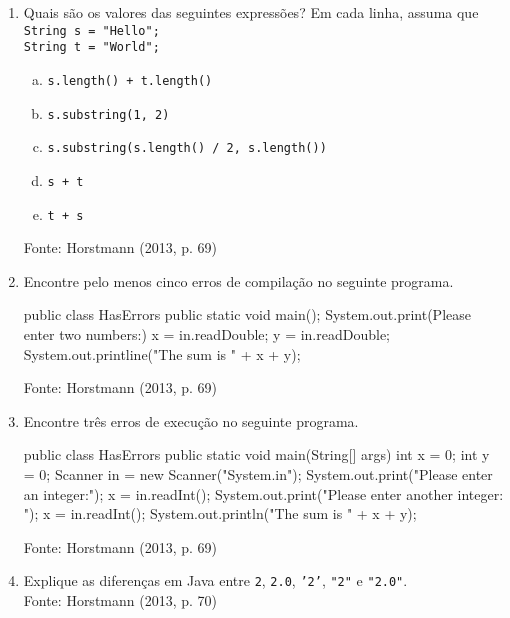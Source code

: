 \documentclass[onecolumn,a4paper,10pt]{report}
\newcommand{\+}{\, + \,}
\newcommand{\<}{\hspace*{-0.4cm}}
\begin{document}
\begin{enumerate}[1.]
\item Quais são os valores das seguintes expressões? Em cada linha, assuma que\\
\texttt{String s = "Hello";\\
String t = "World";}
\begin{enumerate}[a)]
\item \texttt{s.length() + t.length()}
\item \texttt{s.substring(1, 2)}
\item \texttt{s.substring(s.length() / 2, s.length())}
\item \texttt{s + t}
\item \texttt{t + s}
\end{enumerate}
{\tiny Fonte: Horstmann (2013, p. 69)}

\item Encontre pelo menos cinco erros de compilação no seguinte programa.\\
\begin{javacode}
public class HasErrors
{
   public static void main();
   {
      System.out.print(Please enter two numbers:)
      x = in.readDouble;
      y = in.readDouble;
      System.out.printline("The sum is " + x + y);
   }
}
\end{javacode}
{\tiny Fonte: Horstmann (2013, p. 69)}

\item Encontre três erros de execução no seguinte programa.\\
\begin{javacode}
public class HasErrors
{
   public static void main(String[] args)
   {
      int x = 0;
      int y = 0;
      Scanner in = new Scanner("System.in");
      System.out.print("Please enter an integer:");
      x = in.readInt();
      System.out.print("Please enter another integer: ");
      x = in.readInt();
      System.out.println("The sum is " + x + y);
   }
}
\end{javacode}
{\tiny Fonte: Horstmann (2013, p. 69)}

\item Explique as diferenças em Java entre \texttt{2}, \texttt{2.0}, \texttt{'2'}, \texttt{"2"} e \texttt{"2.0"}.\\
{\tiny Fonte: Horstmann (2013, p. 70)}


\end{enumerate}
\end{document}
